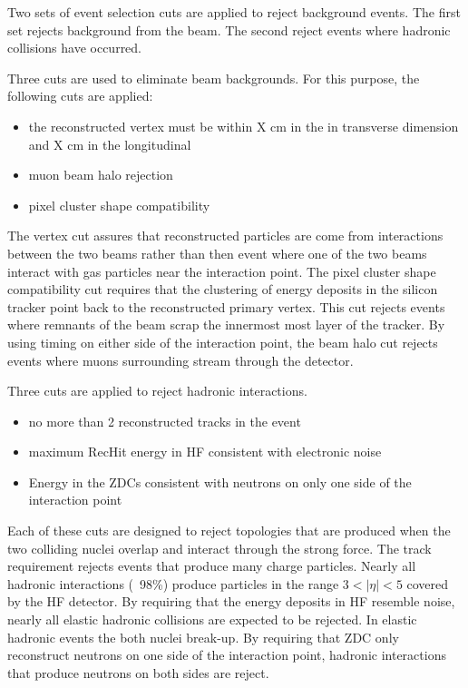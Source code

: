     Two sets of event selection cuts are applied to reject background events. 
    The first set rejects background from the beam.
    The second reject events where hadronic collisions have occurred.
    
    Three cuts are used to eliminate beam backgrounds.
    For this purpose, the following cuts are applied:
    \begin{itemize}
	    \item the reconstructed vertex must be within X cm in the in 
		    transverse dimension and X cm in the longitudinal
	    \item muon beam halo rejection
	    \item pixel cluster shape compatibility
    \end{itemize}
    The vertex cut assures that reconstructed particles are come from 
      interactions between the two beams rather than then event where one of
      the two beams interact with gas particles near the interaction point. 
    The pixel cluster shape compatibility cut requires that the clustering
      of energy deposits in the silicon tracker point back to the reconstructed
      primary vertex. 
    This cut rejects events where remnants of the beam scrap the innermost 
      most layer of the tracker. 
    By using timing on either side of the interaction point, the beam halo cut
      rejects events where muons surrounding stream through the detector. 

    Three cuts are applied to reject hadronic interactions. 
    \begin{itemize}
	    \item no more than 2 reconstructed tracks in the event
	    \item maximum RecHit energy in HF consistent with electronic noise 
	    \item Energy in the ZDCs consistent with neutrons on only one side 
		    of the interaction point
    \end{itemize}
    Each of these cuts are designed to reject topologies that are produced when
      the two colliding nuclei overlap and interact through the strong force. 
    The track requirement rejects events that produce many charge particles.
    Nearly all hadronic interactions (~98\%) produce particles in the 
      range $3<|\eta|<5$ covered by the HF detector.
    By requiring that the energy deposits in HF resemble noise, nearly all
      elastic hadronic collisions are expected to be rejected.
    In elastic hadronic events the both nuclei break-up. 
    By requiring that ZDC only reconstruct neutrons on one side of the 
      interaction point, hadronic interactions that produce neutrons on both 
      sides are reject.

